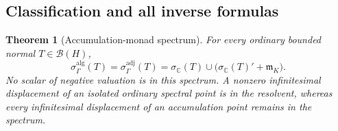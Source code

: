 \documentclass[11pt,a4paper]{article}
\numberwithin{equation}{section}
\newtheorem{theorem}{Theorem}[section]
\theoremstyle{definition}
\theoremstyle{remark}
\newcommand{\C}{\mathbb C}
\newcommand{\mK}{\mathfrak m_K}
\newcommand{\B}{\mathcal B(H)}
\begin{document}
\subsection{Classification and all inverse formulas}\label{ihs:hh:sec:classif}
\begin{theorem}[Accumulation-monad spectrum]\label{ihs:hh:thm:spectrum}
For every ordinary bounded normal $T\in\B$,
\begin{equation}\label{ihs:hh:eq:exactspectrum}
 \sigma_\Gamma^{\mathrm{alg}}(T)
 =\sigma_\Gamma^{\mathrm{adj}}(T)
 =\sigma_\C(T)\cup\bigl(\sigma_\C(T)'+\mK\bigr).
\end{equation}
No scalar of negative valuation is in this spectrum. A nonzero infinitesimal
displacement of an isolated ordinary spectral point is in the resolvent,
whereas every infinitesimal displacement of an accumulation point remains in
the spectrum.
\end{theorem}
\end{document}
